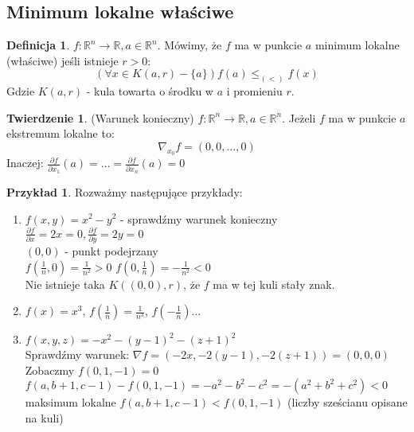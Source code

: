 \documentclass{article}
\theoremstyle{definition}
\newtheorem{de}{Definicja}[subsection]
\theoremstyle{definition}
\newtheorem{tw}{Twierdzenie}[subsection]
\theoremstyle{definition}
\newtheorem{pk}{Przykład}[subsection]
\theoremstyle{definition}
\theoremstyle{definition}
\theoremstyle{definition}
\theoremstyle{definition}
\begin{document}
\subsection{Minimum lokalne właściwe}

\begin{de}
    $f:\mathbb{R}^n \rightarrow \mathbb{R}, a\in\mathbb{R}^n$. 
    Mówimy, że $f$ ma w punkcie $a$ minimum lokalne (właściwe)
    jeśli istnieje $r>0$:
    \[\left(\forall x\in K(a,r) - \{a\}\right) f(a) \leq_{(<)} f(x)\] 
    Gdzie $K(a,r)$ - kula towarta o środku w $a$ i promieniu $r$.
\end{de}

\begin{tw}
    (Warunek konieczny) $f: \mathbb{R}^n \rightarrow \mathbb{R}, a\in\mathbb{R}^n$.
    Jeżeli $f$ ma w punkcie $a$ ekstremum lokalne to:
    \[\nabla_{x_0} f = (0,0,\dots, 0)\]
    Inaczej:
    $\frac{\partial f}{\partial x_1} (a) = \dots = \frac{\partial f}{\partial x_n} (a) = 0$
\end{tw}

\begin{pk}
    Rozważmy następujące przykłady:
    \begin{enumerate}
        \item $f(x,y)=x^2-y^2$ - sprawdźmy warunek konieczny\\
        $\frac{\partial f}{\partial x} = 2x = 0, \frac{\partial f}{\partial y} = 2y = 0$\\
        $(0,0)$ - punkt podejrzany\\
        $f(\frac{1}{n},0) = \frac{1}{n^2} > 0$
        $f(0, \frac{1}{n}) = -\frac{1}{n^2} < 0$\\
        Nie istnieje taka $K((0,0),r)$, że $f$ ma w tej kuli stały znak.
        \item $f(x)=x^3$, $f\left(\frac{1}{n}\right) = \frac{1}{n^3}$, $f\left(-\frac{1}{n}\right)\dots$
        \item $f(x,y,z) = -x^2 - (y-1)^2 - (z+1)^2$\\
        Sprawdźmy warunek: $\nabla f = (-2x, -2(y-1), -2(z+1))=(0,0,0)$\\
        Zobaczmy $f(0,1,-1)=0$\\
        $f(a,b+1,c-1) - f(0,1,-1) = -a^2 -b^2 -c^2 = -(a^2+b^2+c^2) < 0$ maksimum lokalne
        $f(a,b+1,c-1) < f(0,1,-1)$ (liczby sześcianu opisane na kuli)\\
    \end{enumerate}
\end{pk}
\end{document}

